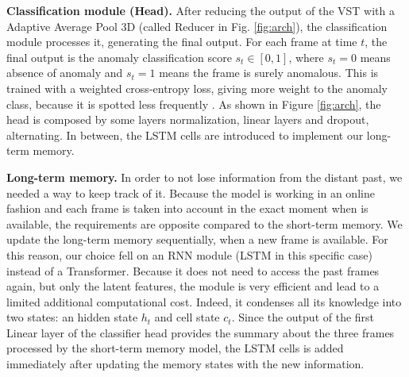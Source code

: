 \noindent\textbf{Classification module (Head).}
After reducing the output of the VST with a Adaptive Average Pool 3D (called Reducer in Fig. \ref{fig:arch}), the classification module processes it, generating the final output.
For each frame at time $t$, the final output is the anomaly classification score $s_t \in [0,1]$, where $s_t=0$ means absence of anomaly and $s_t=1$ means the frame is surely anomalous.
This is trained with a weighted cross-entropy loss, giving more weight to the anomaly class, because it is spotted less frequently  .
As shown in Figure \ref{fig:arch}, the head is composed by some layers normalization, linear layers and dropout, alternating. 
In between, the LSTM cells are introduced to implement our long-term memory.


\noindent\textbf{Long-term memory.}
In order to not lose information from the distant past, we needed a way to keep track of it.
Because the model is working in an online fashion and each frame is taken into account in the exact moment when is available, the requirements are opposite compared to the short-term memory.
We update the long-term memory sequentially, when a new frame is available.
For this reason, our choice fell on an RNN module (LSTM in this specific case) instead of a Transformer.
Because it does not need to access the past frames again, but only the latent features, the module is very efficient and lead to a limited additional computational cost.
Indeed, it condenses all its knowledge into two states: an hidden state $h_t$ and cell state $c_t$.
Since the output of the first Linear layer of the classifier head provides the summary about the three frames processed by the short-term memory model, the LSTM cells is added immediately after updating the memory states with the new information.

